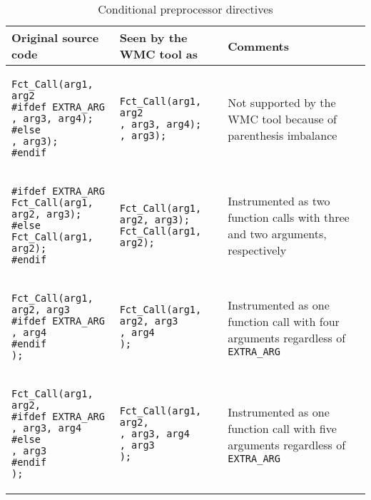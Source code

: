 \begin{table}[ht]
\centering
\caption{Conditional preprocessor directives}
\begin{tabular}{|p{}<{\raggedright}|p{}<{\raggedright}|p{}<{\raggedright}|}
\hline
\textbf{Original source code} & \textbf{Seen by the WMC tool as} & \textbf{Comments} \\
\hline
\begin{BVerbatim}[baseline=t,fontsize=\small]
Fct_Call(arg1, arg2
#ifdef EXTRA_ARG
, arg3, arg4);
#else
, arg3);
#endif

\end{BVerbatim} 
& 
\begin{BVerbatim}[baseline=t,fontsize=\small]
Fct_Call(arg1, arg2
, arg3, arg4);
, arg3);

\end{BVerbatim} 
& Not supported by the WMC tool because of parenthesis imbalance \\
\hline
\begin{BVerbatim}[baseline=t,fontsize=\small]
#ifdef EXTRA_ARG
Fct_Call(arg1, arg2, arg3);
#else
Fct_Call(arg1, arg2);
#endif

\end{BVerbatim} 
& 
\begin{BVerbatim}[baseline=t,fontsize=\small]
Fct_Call(arg1, arg2, arg3);
Fct_Call(arg1, arg2);

\end{BVerbatim} 
& Instrumented as two function calls with three and two arguments, respectively \\
\hline
\begin{BVerbatim}[baseline=t,fontsize=\small]
Fct_Call(arg1, arg2, arg3
#ifdef EXTRA_ARG
, arg4
#endif
);

\end{BVerbatim} 
& 
\begin{BVerbatim}[baseline=t,fontsize=\small]
Fct_Call(arg1, arg2, arg3
, arg4
);

\end{BVerbatim} 
& Instrumented as one function call with four arguments regardless of \verb|EXTRA_ARG| \\
\hline
\begin{BVerbatim}[baseline=t,fontsize=\small]
Fct_Call(arg1, arg2,
#ifdef EXTRA_ARG
, arg3, arg4
#else
, arg3
#endif
);

\end{BVerbatim} 
& 
\begin{BVerbatim}[baseline=t,fontsize=\small]
Fct_Call(arg1, arg2,
, arg3, arg4
, arg3
);

\end{BVerbatim} 
& Instrumented as one function call with five arguments regardless of \verb|EXTRA_ARG| \\
\hline
\end{tabular}
\label{tab:conditional_preprocessor_directives}
\end{table}


